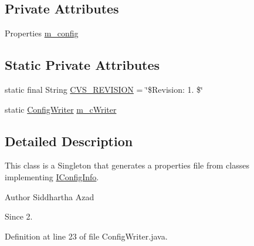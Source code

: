 \subsection*{Private Attributes}
\begin{DoxyCompactItemize}
\item 
Properties \hyperlink{classorg_1_1jgap_1_1data_1_1config_1_1_config_writer_a7b629715224163cac6980b147d852639}{m\-\_\-config}
\end{DoxyCompactItemize}
\subsection*{Static Private Attributes}
\begin{DoxyCompactItemize}
\item 
static final String \hyperlink{classorg_1_1jgap_1_1data_1_1config_1_1_config_writer_aacfdf9dc14ce9c848b420f51618c7a22}{C\-V\-S\-\_\-\-R\-E\-V\-I\-S\-I\-O\-N} = \char`\"{}\$Revision\-: 1. \$\char`\"{}
\item 
static \hyperlink{classorg_1_1jgap_1_1data_1_1config_1_1_config_writer}{Config\-Writer} \hyperlink{classorg_1_1jgap_1_1data_1_1config_1_1_config_writer_aba5e5293462bc2d6d178ff26790c5dd4}{m\-\_\-c\-Writer}
\end{DoxyCompactItemize}


\subsection{Detailed Description}
This class is a Singleton that generates a properties file from classes implementing \hyperlink{interfaceorg_1_1jgap_1_1data_1_1config_1_1_i_config_info}{I\-Config\-Info}.

\begin{DoxyAuthor}{Author}
Siddhartha Azad 
\end{DoxyAuthor}
\begin{DoxySince}{Since}
2. 
\end{DoxySince}


Definition at line 23 of file Config\-Writer.\-java.



